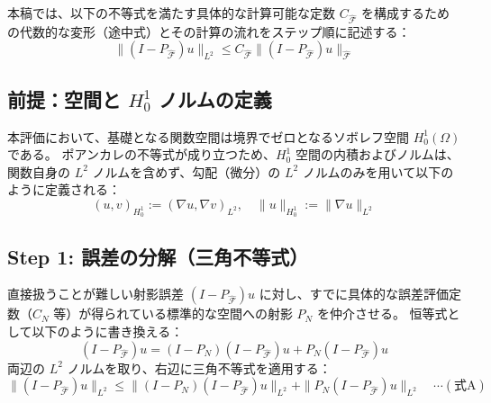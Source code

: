 \documentclass[a4paper, 11pt]{ltjsreport}
\theoremstyle{plain}
\theoremstyle{definition}
\begin{document}
本稿では、以下の不等式を満たす具体的な計算可能な定数 $C_{\hat{\mathcal{F}}}$ を構成するための代数的な変形（途中式）とその計算の流れをステップ順に記述する：
\begin{equation}
\|(I - P_{\hat{\mathcal{F}}})u\|_{L^2} \le C_{\hat{\mathcal{F}}} \|(I - P_{\hat{\mathcal{F}}})u\|_{\hat{\mathcal{F}}}
\end{equation}

\subsection*{前提：空間と $H_0^1$ ノルムの定義}
本評価において、基礎となる関数空間は境界でゼロとなるソボレフ空間 $H_0^1(\Omega)$ である。
ポアンカレの不等式が成り立つため、$H_0^1$ 空間の内積およびノルムは、関数自身の $L^2$ ノルムを含めず、勾配（微分）の $L^2$ ノルムのみを用いて以下のように定義される：
\begin{equation}
(u, v)_{H_0^1} := (\nabla u, \nabla v)_{L^2}, \quad \|u\|_{H_0^1} := \|\nabla u\|_{L^2}
\end{equation}

\subsection*{Step 1: 誤差の分解（三角不等式）}
直接扱うことが難しい射影誤差 $(I - P_{\hat{\mathcal{F}}})u$ に対し、すでに具体的な誤差評価定数（$C_N$ 等）が得られている標準的な空間への射影 $P_N$ を仲介させる。
恒等式として以下のように書き換える：
\begin{equation}
(I - P_{\hat{\mathcal{F}}})u = (I - P_N)(I - P_{\hat{\mathcal{F}}})u + P_N(I - P_{\hat{\mathcal{F}}})u
\end{equation}
両辺の $L^2$ ノルムを取り、右辺に三角不等式を適用する：
\begin{equation}
\|(I - P_{\hat{\mathcal{F}}})u\|_{L^2} \le \|(I - P_N)(I - P_{\hat{\mathcal{F}}})u\|_{L^2} + \|P_N(I - P_{\hat{\mathcal{F}}})u\|_{L^2} \quad \cdots (\text{式A})
\end{equation}
\end{document}
